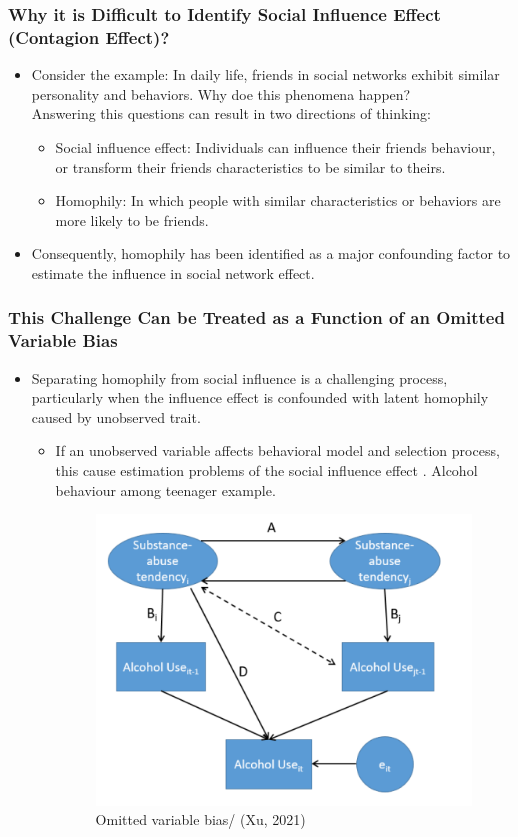 \documentclass{beamer}
\begin{document}
\begin{frame}
\frametitle{Why it is Difficult to Identify Social Influence Effect (Contagion Effect)? }
\begin{itemize}
\item Consider the example: In daily life, friends in social networks exhibit similar personality  and behaviors. Why doe this phenomena happen? \\
Answering this questions can result in two directions of thinking:
\vspace{10 pt}
\begin{itemize}
\item Social influence effect: Individuals can influence their friends behaviour, or transform their friends characteristics to be similar to theirs. 
\vspace{10pt}
\item Homophily: In which people with similar characteristics or behaviors are more likely to be friends. 
\end{itemize}
\vspace{10 pt}
\item Consequently, homophily has been identified as a major confounding factor to estimate the influence in social network effect. 

\end{itemize}
\end{frame}
\begin{frame}
\frametitle{This Challenge Can be Treated  as  a Function of an Omitted Variable Bias}
\begin{itemize}
\item{Separating homophily from  social influence is
a challenging process, particularly when the influence effect  is confounded with latent homophily caused by unobserved trait.}
\vspace{10pt}
\begin{itemize}
    \item If an unobserved variable affects behavioral model and selection process, this cause estimation problems of the social influence effect \cite{XU2018101}. Alcohol behaviour among teenager example.
    \begin{figure}[h!]
  \centering
  \includegraphics[width=.4\linewidth]{rx.png}
  \caption{Omitted variable bias/  (Xu, 2021)}
  \label{fig:fig1}
\end{figure}
\end{itemize}
\end{itemize}
\end{frame}
\end{document}
